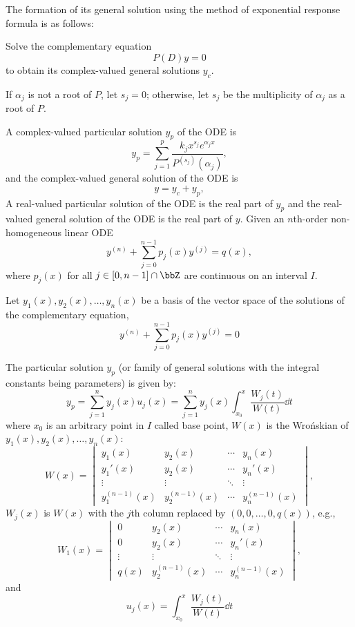 \documentclass[a4paper,12pt]{report}
\begin{document}
The formation of its general solution using the method of exponential response formula is as follows:
\ben
\item Solve the complementary equation
\[P(D)y=0\]
to obtain its complex-valued general solutions $y_c$.
\item If $\alpha_j$ is not a root of $P$, let $s_j=0$; otherwise, let $s_j$ be the multiplicity of $\alpha_j$ as a root of $P$.
\item A complex-valued particular solution $y_p$ of the ODE is
\[y_p=\sum_{j=1}^p\frac{k_jx^{s_j}e^{\alpha_jx}}{P^{(s_j)}(\alpha_j)},\]
and the complex-valued general solution of the ODE is
\[y=y_c+y_p,\]
A real-valued particular solution of the ODE is the real part of $y_p$ and the real-valued general solution of the ODE is the real part of $y$.
\een
{}
Given an $n$th-order non-homogeneous linear ODE
\[y^{(n)}+\sum_{j=0}^{n-1}p_j(x)y^{(j)}=q(x),\]
where $p_j(x)$ for all $j\in [0,n-1]\cap\bbZ$ are continuous on an interval $I$.
\ben
\item Let $y_1(x),y_2(x),\ldots,y_n(x)$ be a basis of the vector space of the solutions of the complementary equation,
\[y^{(n)}+\sum_{j=0}^{n-1}p_j(x)y^{(j)}=0\]
\item The particular solution $y_p$ (or family of general solutions with the integral constants being parameters) is given by:
\[y_p=\sum_{j=1}^ny_j(x)u_j(x)=\sum_{j=1}^ny_j(x)\int_{x_0}^x\frac{W_j(t)}{W(t)}\dd{t}\]
where $x_0$ is an arbitrary point in $I$ called base point, $W(x)$ is the Wrońskian of $y_1(x),y_2(x),\ldots,y_n(x)$:
\[W(x)=\begin{vmatrix}
y_1(x) & y_2(x) & \cdots & y_n(x) \\
y_1'(x) & y_2(x) & \cdots & y_n'(x) \\
\vdots & \vdots & \ddots & \vdots \\
y_1^{(n-1)}(x) & y_2^{(n-1)}(x) & \cdots & y_n^{(n-1)}(x)
\end{vmatrix},\]
$W_j(x)$ is $W(x)$ with the $j$th column replaced by $(0,0,\ldots,0,q(x))$, e.g.,
\[W_1(x)=\begin{vmatrix}
0 & y_2(x) & \cdots & y_n(x) \\
0 & y_2(x) & \cdots & y_n'(x) \\
\vdots & \vdots & \ddots & \vdots \\
q(x) & y_2^{(n-1)}(x) & \cdots & y_n^{(n-1)}(x)
\end{vmatrix},\]
and
\[u_j(x)=\int_{x_0}^x\frac{W_j(t)}{W(t)}\dd{t}\]
\end{document}
